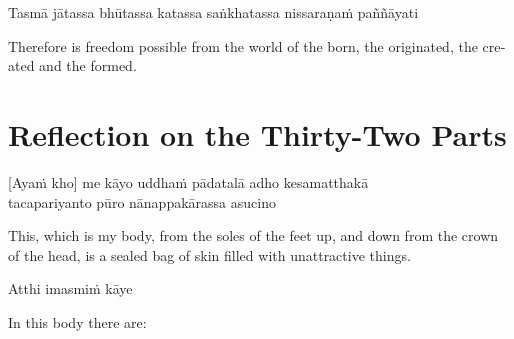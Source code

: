 Tasmā jātassa bhūtassa katassa saṅkhatassa nissaraṇaṁ paññāyati

\begin{english}
  Therefore is freedom possible from the world of the born, the originated, the created and the formed. 
\end{english}

\section{Reflection on the Thirty-Two Parts}

\begin{leader}
\end{leader}


[Ayaṁ kho] me kāyo uddhaṁ pādatalā adho kesamatthakā\\
tacapariyanto pūro nānappakārassa asucino

\begin{english}
  This, which is my body, from the soles of the feet up, and down from the crown of the head, is a sealed bag of skin filled with unattractive things.
\end{english}

Atthi imasmiṁ kāye

\begin{english}
  In this body there are:
\end{english}


